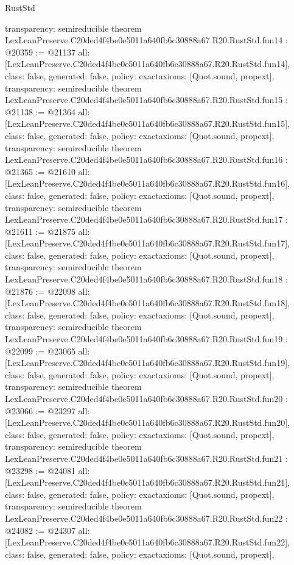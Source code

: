 \begin{lexlean}{RustStd}
\begin{coremodule}
{  transparency: semireducible
}
theorem LexLeanPreserve.C20ded4f4be0e5011a640fb6c30888a67.R20.RustStd.fun14 : @20359 := @21137 {
  all: [LexLeanPreserve.C20ded4f4be0e5011a640fb6c30888a67.R20.RustStd.fun14],
  class: false,
  generated: false,
  policy: exact{axioms: [Quot.sound, propext]},
  transparency: semireducible
}
theorem LexLeanPreserve.C20ded4f4be0e5011a640fb6c30888a67.R20.RustStd.fun15 : @21138 := @21364 {
  all: [LexLeanPreserve.C20ded4f4be0e5011a640fb6c30888a67.R20.RustStd.fun15],
  class: false,
  generated: false,
  policy: exact{axioms: [Quot.sound, propext]},
  transparency: semireducible
}
theorem LexLeanPreserve.C20ded4f4be0e5011a640fb6c30888a67.R20.RustStd.fun16 : @21365 := @21610 {
  all: [LexLeanPreserve.C20ded4f4be0e5011a640fb6c30888a67.R20.RustStd.fun16],
  class: false,
  generated: false,
  policy: exact{axioms: [Quot.sound, propext]},
  transparency: semireducible
}
theorem LexLeanPreserve.C20ded4f4be0e5011a640fb6c30888a67.R20.RustStd.fun17 : @21611 := @21875 {
  all: [LexLeanPreserve.C20ded4f4be0e5011a640fb6c30888a67.R20.RustStd.fun17],
  class: false,
  generated: false,
  policy: exact{axioms: [Quot.sound, propext]},
  transparency: semireducible
}
theorem LexLeanPreserve.C20ded4f4be0e5011a640fb6c30888a67.R20.RustStd.fun18 : @21876 := @22098 {
  all: [LexLeanPreserve.C20ded4f4be0e5011a640fb6c30888a67.R20.RustStd.fun18],
  class: false,
  generated: false,
  policy: exact{axioms: [Quot.sound, propext]},
  transparency: semireducible
}
theorem LexLeanPreserve.C20ded4f4be0e5011a640fb6c30888a67.R20.RustStd.fun19 : @22099 := @23065 {
  all: [LexLeanPreserve.C20ded4f4be0e5011a640fb6c30888a67.R20.RustStd.fun19],
  class: false,
  generated: false,
  policy: exact{axioms: [Quot.sound, propext]},
  transparency: semireducible
}
theorem LexLeanPreserve.C20ded4f4be0e5011a640fb6c30888a67.R20.RustStd.fun20 : @23066 := @23297 {
  all: [LexLeanPreserve.C20ded4f4be0e5011a640fb6c30888a67.R20.RustStd.fun20],
  class: false,
  generated: false,
  policy: exact{axioms: [Quot.sound, propext]},
  transparency: semireducible
}
theorem LexLeanPreserve.C20ded4f4be0e5011a640fb6c30888a67.R20.RustStd.fun21 : @23298 := @24081 {
  all: [LexLeanPreserve.C20ded4f4be0e5011a640fb6c30888a67.R20.RustStd.fun21],
  class: false,
  generated: false,
  policy: exact{axioms: [Quot.sound, propext]},
  transparency: semireducible
}
theorem LexLeanPreserve.C20ded4f4be0e5011a640fb6c30888a67.R20.RustStd.fun22 : @24082 := @24307 {
  all: [LexLeanPreserve.C20ded4f4be0e5011a640fb6c30888a67.R20.RustStd.fun22],
  class: false,
  generated: false,
  policy: exact{axioms: [Quot.sound, propext]},
}
\end{coremodule}
\end{lexlean}
